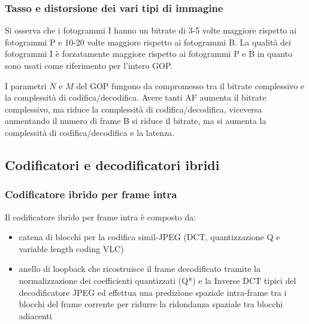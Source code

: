 \subsubsection*{Tasso e distorsione dei vari tipi di immagine}
Si osserva che i fotogrammi I hanno un bitrate di 3-5 volte maggiore rispetto ai fotogrammi P e 10-20 volte maggiore rispetto
ai fotogrammi B. La qualità dei fotogrammi I è forzatamente maggiore rispetto ai fotogrammi P e B in quanto sono usati come
riferimento per l'intero GOP.

I parametri \(N\) e \(M\) del GOP fungono da compromesso tra il bitrate complessivo e la complessità di codifica/decodifica.
Avere tanti AF aumenta il bitrate complessivo, ma riduce la complessità di codifica/decodifica, viceversa aumentando il numero
di frame B si riduce il bitrate, ma si aumenta la complessità di codifica/decodifica e la latenza.

\subsection{Codificatori e decodificatori ibridi}
\subsubsection*{Codificatore ibrido per frame intra}
Il codificatore ibrido per frame intra è composto da:
\begin{itemize}
	\item catena di blocchi per la codifica simil-JPEG (DCT, quantizzazione Q e variable length coding VLC)
	\item anello di loopback che ricostruisce il frame decodificato tramite la normalizzazione dei coefficienti quantizzati
	(Q*) e la Inverse DCT tipici del decodificatore JPEG ed effettua una predizione spaziale intra-frame tra i blocchi del
	frame corrente per ridurre la ridondanza spaziale tra blocchi adiacenti
\end{itemize}

